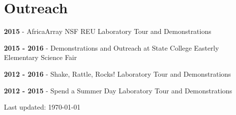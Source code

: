 \documentclass[letterpaper]{article}
\def\footerlink{}
\renewenvironment{itemize}{
  \begin{list}{}{
    \setlength{\leftmargin}{1.5em}
  }
}{
  \end{list}
}
\begin{document}
\section*{Outreach}
\begin{itemize}
\item \textbf{2015} - AfricaArray NSF REU Laboratory Tour and Demonstrations
\item\textbf{2015 - 2016} - Demonstrations and Outreach at State College Easterly Elementary Science Fair
\item \textbf{2012 - 2016} - Shake, Rattle, Rocks! Laboratory Tour and Demonstrations
\item \textbf{2012 - 2015} - Spend a Summer Day Laboratory Tour and Demonstrations
\end{itemize}

\begin{center}
  \begin{footnotesize}
    Last updated: \today \\
    \href{\footerlink}{\texttt{\footerlink}}
  \end{footnotesize}
\end{center}
\end{document}

